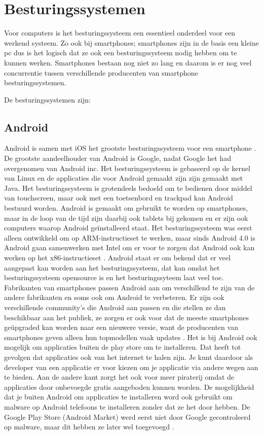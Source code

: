 ﻿\chapter{Besturingssystemen}

Voor computers is het besturingssysteem een essentieel onderdeel voor een werkend systeem. Zo ook bij smartphones; smartphones zijn in de basis een kleine pc dus is het logisch dat ze ook een besturingssysteem nodig hebben om te kunnen werken. Smartphones bestaan nog niet zo lang en daarom is er nog veel concurrentie tussen verschillende producenten van smartphone besturingssystemen.

De besturingssystemen zijn:

\section{Android}

Android is samen met iOS het grootste besturingssysteem voor een smartphone \citep{canalys}. De grootste aandeelhouder van Android is Google, nadat Google het had overgenomen van Android inc. Het besturingssysteem is gebaseerd op de kernel van Linux en de applicaties die voor Android gemaakt zijn zijn gemaakt met Java. Het besturingssysteem is grotendeels bedoeld om te bedienen door middel van touchscreen, maar ook met een toetsenbord en trackpad kan Android bestuurd worden. Android is gemaakt om gebruikt te worden op smartphones, maar in de loop van de tijd zijn daarbij ook tablets bij gekomen en er zijn ook computers waarop Android ge\"installeerd staat. Het besturingssysteem was eerst alleen ontwikkeld om op ARM-instructieset te werken, maar sinds Android 4.0 is Android gaan samenwerken met Intel om er voor te zorgen dat Android ook kan werken op het x86-instructieset \citep{pcmweb}. Android staat er om bekend dat er veel aangepast kan worden aan het besturingssysteem, dat kan omdat het besturingssysteem opensource is en het besturingssyteem laat veel toe. Fabrikanten van smartphones passen Android aan om verschillend te zijn van de andere fabrikanten en soms ook om Android te verbeteren. Er zijn ook verschillende community's die Android aan passen en die stellen ze dan beschikbaar aan het publiek, ze zorgen er ook voor dat de meeste smartphones ge\"upgraded kan worden naar een nieuwere versie, want de producenten van smartphones geven alleen hun topmodellen vaak updates \citep{gsmacties}. Het is bij Android ook mogelijk om applicaties buiten de play store om te installeren. Dat heeft tot gevolgen dat applicaties ook van het internet te halen zijn. Je kunt daardoor als developer van een applicatie er voor kiezen om je applicatie via andere wegen aan te bieden. Aan de andere kant zorgt het ook voor meer piraterij omdat de applicaties door onbevoegde gratis aangeboden kunnen worden. De mogelijkheid dat je buiten Android om applicaties te installeren word ook gebruikt om malware op Android telefoons te installeren zonder dat ze het door hebben. De Google Play Store (Android Market) werd eerst niet door Google gecontroleerd op malware, maar dit hebben ze later wel toegevoegd \citep{zdnet}.


